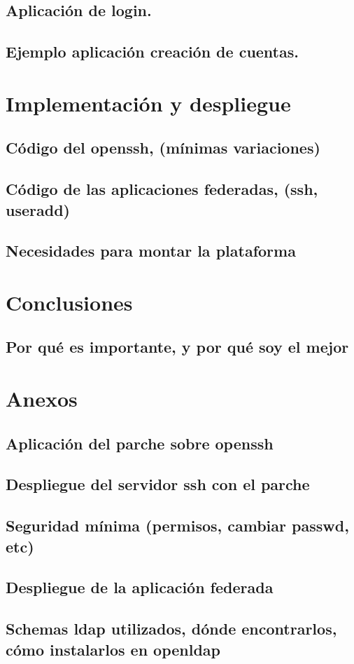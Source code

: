     \subsection{Aplicación de login.}
    \subsection{Ejemplo aplicación creación de cuentas.}

\newpage


\section{Implementación y despliegue}
    \subsection{Código del openssh, (mínimas variaciones)}
    \subsection{Código de las aplicaciones federadas, (ssh, useradd)}
    \subsection{Necesidades para montar la plataforma}

\newpage


\section{Conclusiones}
    \subsection{Por qué es importante, y por qué soy el mejor}

\newpage


\section{Anexos}
    \subsection{Aplicación del parche sobre openssh}
    \subsection{Despliegue del servidor ssh con el parche}
    \subsection{Seguridad mínima (permisos, cambiar passwd, etc)}
    \subsection{Despliegue de la aplicación federada}
    \subsection{Schemas ldap utilizados, dónde encontrarlos, cómo instalarlos
    en openldap}

\newpage



